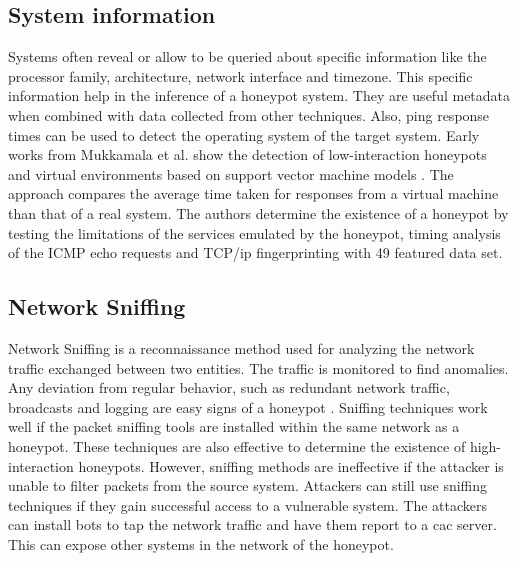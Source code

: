 \subsection{System information}
Systems often reveal or allow to be queried about specific information like the processor family, architecture, network interface and timezone. This specific information help in the inference of a honeypot system. They are useful metadata when combined with data collected from other techniques.  Also, ping response times can be used to detect the operating system of the target system. Early works from Mukkamala et al.  show the detection of low-interaction honeypots and virtual environments based on support vector machine models \cite{mukkamala}. The approach compares the average time taken for responses from a virtual machine than that of a real system. The authors determine the existence of a honeypot by testing the limitations of the services emulated by the honeypot, timing analysis of the ICMP echo requests and TCP/\acrshort{ip} fingerprinting with 49 featured data set.  

\subsection{Network Sniffing}
Network Sniffing is a reconnaissance method used for analyzing the network traffic exchanged between two entities. The traffic is monitored to find anomalies. Any deviation from regular behavior, such as redundant network traffic, broadcasts and logging are easy signs of a honeypot . Sniffing techniques work well if the packet sniffing tools are installed within the same network as a honeypot. These techniques are also effective to determine the existence of high-interaction honeypots. However, sniffing methods are ineffective if the attacker is unable to filter packets from the source system. Attackers can still use sniffing techniques if they gain successful access to a vulnerable system. The attackers can install bots to tap the network traffic and have them report to a \acrshort{cac}  server. This can expose other systems in the network of the honeypot. 

